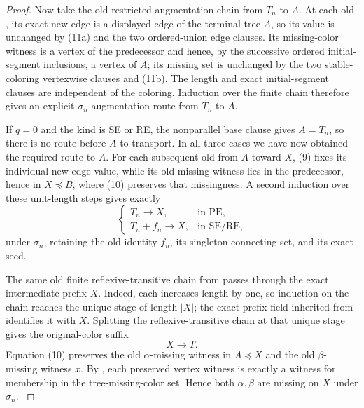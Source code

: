 \begin{proof}
Now take the old restricted augmentation chain from \(T_n\) to \(A\).
At each old , its exact new edge is a
displayed edge of the terminal tree \(A\), so its value is unchanged by
(11a) and the two ordered-union edge clauses.  Its missing-color witness
is a vertex of the predecessor and hence, by the successive ordered
initial-segment inclusions, a vertex of \(A\); its missing set is
unchanged by the two stable-coloring vertexwise clauses and (11b).
The length and exact initial-segment clauses are independent of the
coloring.  Induction over the finite chain therefore gives an explicit
\(\sigma_n\)-augmentation route from \(T_n\) to \(A\).

If \(q=0\) and the kind is SE or RE, the nonparallel base clause gives
\(A=T_n\), so there is no route before \(A\) to transport.  In all three
cases we have now obtained the required route to \(A\).  For each
subsequent old  from \(A\) toward \(X\),
(9) fixes its individual new-edge value, while its old missing witness
lies in the predecessor, hence in \(X\preccurlyeq B\), where (10)
preserves that missingness.  A second induction over these unit-length
steps gives exactly
\[
\begin{cases}
T_n\longrightarrow X,&\text{in PE},\\
T_n+f_n\longrightarrow X,&\text{in SE/RE},
\end{cases}                                                   \tag{11}
\]
under \(\sigma_n\), retaining the old identity \(f_n\), its singleton
connecting set, and its exact  seed.

The same old finite reflexive-transitive chain from
 passes through the exact
intermediate prefix \(X\).  Indeed, each
 increases length by one, so induction on
the chain reaches the unique stage of length \(|X|\); the exact-prefix
field inherited from  identifies it with
\(X\).  Splitting the reflexive-transitive chain at that unique stage gives
the original-color suffix
\[
                         X\longrightarrow T.                 \tag{12}
\]
Equation (10) preserves the old \(\alpha\)-missing witness in
\(A\preccurlyeq X\) and the old \(\beta\)-missing witness \(x\).
By , each preserved vertex witness is exactly a
witness for membership in the tree-missing-color set.  Hence both
\(\alpha,\beta\) are missing on \(X\) under \(\sigma_n\).              \(\tag{13}\)


\end{proof}
